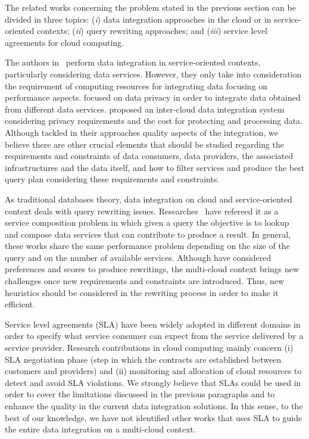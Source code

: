 The related works concerning the problem stated in the previous section can be divided in three topics: (\textit{i}) data integration approaches in the cloud or in service-oriented contexts; (\textit{ii}) query rewriting approaches; and (\textit{iii}) service level agreements for cloud computing.

The authors in~\cite{Correndo2010,ElSheikh2013} perform data integration in service-oriented contexts, particularly considering data services. However, they only take into consideration the requirement of computing resources for integrating data focusing on performance aspects. \cite{YauY08} focused on data privacy in order to integrate data obtained from different data services. \cite{Tian2010} proposed an inter-cloud data integration system considering privacy requirements and the cost for protecting and processing data. Although \cite{Tian2010,YauY08} tackled in their approaches quality aspects of the integration, we believe there are other crucial elements that should be studied regarding the requirements and constraints of data consumers, data providers, the associated infrastructures and the data itself, and how to filter services and produce the best query plan considering these requirements and constraints.

As traditional databases theory, data integration on cloud and service-oriented context deals with query rewriting issues. Researches~\cite{ba2014,Barhamgi2010,Benouaret2011,Umberto} have refereed it as a service composition problem in which given a query the objective is to lookup and compose data services that can contribute to produce a result. In general, these works share the same performance problem depending on the size of the query and on the number of available services. Although \cite{ba2014,Benouaret2011} have considered preferences and scores to produce rewritings, the multi-cloud context brings new challenges once new requirements and constraints are introduced. Thus, new heuristics should be considered in the rewriting process in order to make it efficient. 

Service level agreements (SLA) have been widely adopted in different domains in order to specify what service consumer can expect from the service delivered by a service provider. Research contributions in cloud computing mainly concern (i) SLA negotiation phase (step in which the contracts are established between customers and providers) and (ii) monitoring and allocation of cloud resources to detect and avoid SLA violations. We strongly believe that SLAs could be used in order to cover the limitations discussed in the previous paragraphs and to enhance the quality in the current data integration solutions. In this sense, to the best of our knowledge, we have not identified other works that uses SLA to guide the entire data integration on a multi-cloud context.
